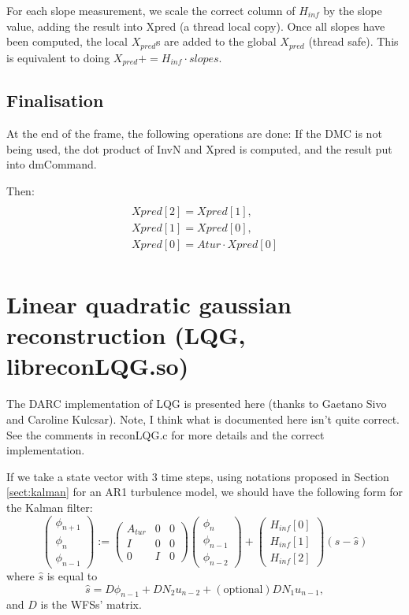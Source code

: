 \documentclass[a4,10pt]{article}
\begin{document}
For each slope measurement, we scale the correct column of $H_{inf}$ by the
slope value, adding the result into Xpred (a thread local copy).  Once
all slopes have been computed, the local $X_{pred}$s are added to the
global $X_{pred}$ (thread safe).  This is equivalent to doing $X_{pred}+=H_{inf}
\cdot slopes$.  

\subsection{Finalisation}
At the end of the frame, the following operations are done:
If the DMC is not being used, the dot product of InvN and Xpred is
computed, and the result put into dmCommand.

Then: 
\begin{multline}\\
Xpred[2]=Xpred[1],\\
Xpred[1]=Xpred[0],\\
Xpred[0]=Atur \cdot Xpred[0]\\
\end{multline}



\section{Linear quadratic gaussian reconstruction (LQG, libreconLQG.so)}
\label{sect:lqg}
The DARC implementation of LQG is presented here (thanks to Gaetano
Sivo and Caroline Kulcsar).  Note, I think what is documented here
isn't quite correct.  See the comments in reconLQG.c for more details
and the correct implementation.

If we take a state vector with 3 time steps, using
notations proposed in Section \ref{sect:kalman} for an AR1 turbulence model, we should have the following form for the Kalman filter:
\begin{equation}
\begin{pmatrix}
\phi_{n+1} \\
\phi_n \\
\phi_{n-1} \end{pmatrix}
:=\begin{pmatrix}A_{tur} &0&0\\
I&0&0\\
0&I&0\end{pmatrix}\begin{pmatrix}
\phi_{n}\\
\phi_{n-1}\\
\phi_{n-2}\end{pmatrix}+\begin{pmatrix}H_{inf}[0]\\H_{inf}[1]\\H_{inf}[2]\end{pmatrix}(s-\hat{s})
\label{eq:Kalman1}
\end{equation}
where $\hat{s}$ is equal to
\begin{equation}
\hat{s}=D\phi_{n-1}+DN_2u_{n-2} + \mathrm{(optional)} DN_1u_{n-1},
\label{eq:shat}
\end{equation}
and $D$ is the WFSs' matrix.
\end{document}

